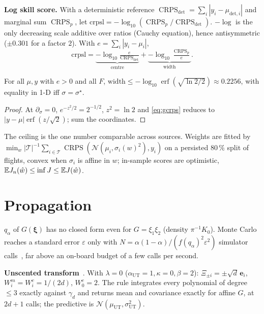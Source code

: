 \documentclass[10pt,twocolumn]{article}
\newcommand{\Germ}{\bm\xi}
\newcommand{\Norm}{\mathcal N}
\newcommand{\CRPS}{\operatorname{CRPS}}
\newcommand{\erf}{\operatorname{erf}}
\begin{document}
\textbf{Log skill score.} With a deterministic reference $\CRPS_{\mathrm{det}}=\sum_i|y_i-\mu_{\mathrm{det},i}|$ and marginal sum $\CRPS_p$, let $\mathrm{crpsl}=-\log_{10}(\CRPS_p/\CRPS_{\mathrm{det}})$. $-\log$ is the only decreasing scale additive over ratios (Cauchy equation), hence antisymmetric ($\pm0.301$ for a factor $2$). With $e=\sum_i|y_i-\mu_i|$,
\begin{equation}
\mathrm{crpsl}=\underbrace{-\log_{10}\tfrac{e}{\CRPS_{\mathrm{det}}}}_{\text{centre}}+\underbrace{-\log_{10}\tfrac{\CRPS_p}{e}}_{\text{width}}.
\end{equation}
\begin{theorem}
For all $\mu,y$ with $e>0$ and all $F$, $\mathrm{width}\le-\log_{10}\erf(\sqrt{\ln2/2})\approx0.2256$, with equality in 1-D iff $\sigma=\sigma^\star$.
\end{theorem}
\begin{proof}
At $\partial_\sigma=0$, $e^{-z^2/2}=2^{-1/2}$, $z^2=\ln2$ and \eqref{eq:gcrps} reduces to $|y-\mu|\erf(z/\sqrt2)$; sum the coordinates.
\end{proof}
The ceiling is the one number comparable across sources. Weights are fitted by $\min_w|\mathcal T|^{-1}\sum_{i\in\mathcal T}\CRPS(\Norm(\mu_i,\sigma_i(w)^2),y_i)$ on a persisted $80\,\%$ split of flights, convex when $\sigma_i$ is affine in $w$; in-sample scores are optimistic, $\mathbb{E} J_n(\hat w)\le\inf J\le\mathbb{E} J(\hat w)$.

\section{Propagation}
$q_\alpha$ of $G(\Germ)$ has no closed form even for $G=\xi_1\xi_2$ (density $\pi^{-1}K_0$). Monte Carlo reaches a standard error $\varepsilon$ only with $N=\alpha(1-\alpha)/(f(q_\alpha)^2\varepsilon^2)$ simulator calls~\cite{vandervaart1998}, far above an on-board budget of a few calls per second.

\textbf{Unscented transform}~\cite{julier1997,wan2000}. With $\lambda=0$ ($\alpha_{\mathrm{UT}}=1,\kappa=0,\beta=2$): $\Xi_{\pm i}=\pm\sqrt d\,\bm e_i$, $W^m_i=W^c_i=1/(2d)$, $W^c_0=2$. The rule integrates every polynomial of degree $\le3$ exactly against $\gamma_d$ and returns mean and covariance exactly for affine $G$, at $2d+1$ calls; the predictive is $\Norm(\mu_{\mathrm{UT}},\sigma_{\mathrm{UT}}^2)$.
\end{document}
